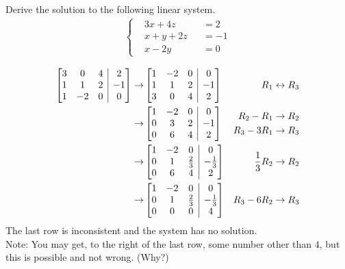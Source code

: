 \begin{Exercise}
Derive the solution to the following linear system.
\begin{align*}
\left\{\begin{alignedat}{2}
& 3x + 4z & &= 2\\
& x + y + 2z & &= -1\\
& x - 2y & &= 0
\end{alignedat}\right.
\end{align*}
\end{Exercise}
\begin{Answer}
\begin{align*}
\left[
\begin{array}{@{}ccc|c@{}}
3 & 0 & 4 & 2\\
1 & 1 & 2 & -1\\
1 & -2 & 0 & 0
\end{array}
\right]
\to &
\left[
\begin{array}{@{}ccc|c@{}}
1 & -2 & 0 & 0\\
1 & 1 & 2 & -1\\
3 & 0 & 4 & 2\\
\end{array}
\right]
& R_1 \leftrightarrow R_3\\
\to &
\left[
\begin{array}{@{}ccc|c@{}}
1 & -2 & 0 & 0\\
0 & 3 & 2 & -1\\
0 & 6 & 4 & 2
\end{array}
\right]
& 
\begin{aligned}
R_2 - R_1 &\to R_2 \\
R_3 - 3R_1 &\to R_3     
\end{aligned} \\
\to &
\left[
\begin{array}{@{}ccc|c@{}}
1 & -2 & 0 & 0\\
0 & 1 & \frac{2}{3} & -\frac{1}{3}\\
0 & 6 & 4 & 2
\end{array}
\right] & \frac{1}{3}R_2 \to R_2 \\
\to &
\left[
\begin{array}{@{}ccc|c@{}}
1 & -2 & 0 & 0\\
0 & 1 & \frac{2}{3} & -\frac{1}{3}\\
0 & 0 & 0 & 4
\end{array}
\right] & R_3 - 6R_2 \to R_3
\end{align*}
The last row is inconsistent and the system has no solution.\\ 
Note: You may get, to the right of the last row, some number other than $4$, but this is possible and not wrong. (Why?)    
\end{Answer}

